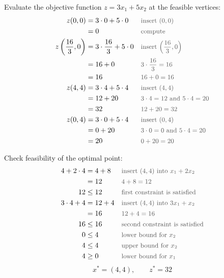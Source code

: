 \documentclass[a4paper,11pt]{article}
\newif\ifexplain
\newcommand{\why}[1]{\text{\small\color{black!65}#1}}
\newcommand{\explain}[1]{\ifexplain\begin{erklbox}#1\end{erklbox}\fi}
\begin{document}
\begin{center}
\end{center}

Evaluate the objective function $z=3x_1+5x_2$ at the feasible vertices:
\begin{align*}
z(0,0)&=3\cdot0+5\cdot0 && \why{insert $(0,0)$}\\
&=0 && \why{compute}\\
z\left(\frac{16}{3},0\right)&=3\cdot\frac{16}{3}+5\cdot0 && \why{insert $\left(\frac{16}{3},0\right)$}\\
&=16+0 && \why{$3\cdot\frac{16}{3}=16$}\\
&=16 && \why{$16+0=16$}\\
z(4,4)&=3\cdot4+5\cdot4 && \why{insert $(4,4)$}\\
&=12+20 && \why{$3\cdot4=12$ and $5\cdot4=20$}\\
&=32 && \why{$12+20=32$}\\
z(0,4)&=3\cdot0+5\cdot4 && \why{insert $(0,4)$}\\
&=0+20 && \why{$3\cdot0=0$ and $5\cdot4=20$}\\
&=20 && \why{$0+20=20$}
\end{align*}
\explain{Der größte Wert in der Liste ist $32$. Die gestrichelte orange Zielfunktionsgerade im Bild ist $3x_1+5x_2=32$ und berührt die zulässige Menge im Punkt $(4,4)$.}
Check feasibility of the optimal point:
\begin{align*}
4+2\cdot4&=4+8 && \why{insert $(4,4)$ into $x_1+2x_2$}\\
&=12 && \why{$4+8=12$}\\
12&\le12 && \why{first constraint is satisfied}\\
3\cdot4+4&=12+4 && \why{insert $(4,4)$ into $3x_1+x_2$}\\
&=16 && \why{$12+4=16$}\\
16&\le16 && \why{second constraint is satisfied}\\
0&\le4 && \why{lower bound for $x_2$}\\
4&\le4 && \why{upper bound for $x_2$}\\
4&\ge0 && \why{lower bound for $x_1$}
\end{align*}
\[
\boxed{x^*=(4,4),\qquad z^*=32}
\]
\end{document}
